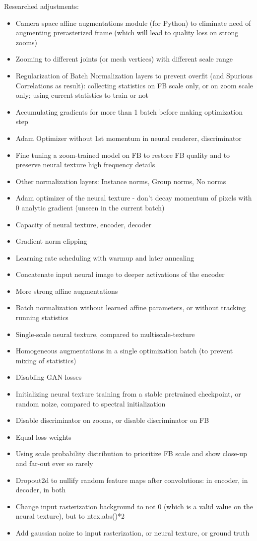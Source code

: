 Researched adjustments:
\begin{itemize}
	\item Camera space affine augmentations module (for Python) to eliminate need of augmenting prerasterized frame (which will lead to quality loss on strong zooms)
	\item Zooming to different joints (or mesh vertices) with different scale range 
	\item Regularization of Batch Normalization layers to prevent overfit (and Spurious Correlations as result): collecting statistics on FB scale only, or on zoom scale only; using current statistics to train or not
	\item Accumulating gradients for more than 1 batch before making optimization step
	\item Adam Optimizer without 1st momentum in neural renderer, discriminator
	\item Fine tuning a zoom-trained model on FB to restore FB quality and to preserve neural texture high frequency details
	\item Other normalization layers: Instance norms, Group norms, No norms
	\item Adam optimizer of the neural texture - don't decay momentum of pixels with 0 analytic gradient (unseen in the current batch)
	\item Capacity of neural texture, encoder, decoder
	\item Gradient norm clipping
	\item Learning rate scheduling with warmup and later annealing
	\item Concatenate input neural image to deeper activations of the encoder
	\item More strong affine augmentations 
	\item Batch normalization without learned affine parameters, or without tracking running statistics 
	\item Single-scale neural texture, compared to multiscale-texture
	\item Homogeneous augmentations in a single optimization batch (to prevent mixing of statistics)
	\item Disabling GAN losses
	\item Initializing neural texture training from a stable pretrained checkpoint, or random noize, compared to spectral initialization
	\item Disable discriminator on zooms, or disable discriminator on FB
	\item Equal loss weights
	\item Using scale probability distribution to prioritize FB scale and show close-up and far-out ever so rarely
	\item Dropout2d to nullify random feature maps after convolutions: in encoder, in decoder, in both
	\item Change input rasterization background to not 0 (which is a valid value on the neural texture), but to ntex.abs()*2
	\item Add gaussian noize to input rasterization, or neural texture, or ground truth
	
\end{itemize}